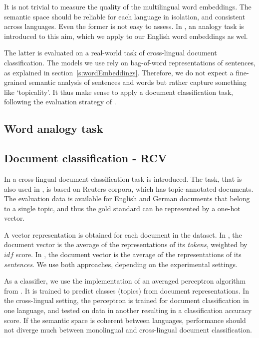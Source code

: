 

It is not trivial to measure the quality of the multilingual word embeddings. The semantic space should be reliable for each language in isolation, and consistent across languages. 
Even the former is not easy to assess. In \cite{mikolov2013efficient}, an analogy task is introduced to this aim, which we apply to our English word embeddings as wel.

The latter is evaluated on a real-world task of cross-lingual document classification. The models we use rely on bag-of-word representations of sentences, as explained in section~\ref{s:wordEmbeddings}. Therefore, we do not expect a fine-grained semantic analysis of sentences and words but rather capture something like `topicality'. It thus make sense to apply a document classification task, following the evaluation strategy of  \cite{klementiev2012inducing, hermann2013multilingual,hermann2014multilingual}.


\subsection{Word analogy task}


\subsection{Document classification - RCV}
In \cite{klementiev2012inducing} a cross-lingual document classification task is introduced. The task, that is also used in \cite{hermann2013multilingual}, is based on Reuters corpora, which has topic-annotated documents. The evaluation data is available for English and German documents that belong to a single topic, and thus the gold standard can be represented by a one-hot vector.

A vector representation is obtained for each document in the dataset. In \cite{klementiev2012inducing}, the document vector is the average of the representations of its \emph{tokens}, weighted by $idf$ score. In \cite{hermann2013multilingual}, the document vector is the average of the representations of its \emph{sentences}. We use both approaches, depending on the experimental settings.

As a classifier, we use the implementation of an averaged perceptron algorithm from \cite{klementiev2012inducing}. It is trained to predict classes (topics) from document representations. In the cross-lingual setting, the perceptron is trained for document classification in one language, and tested on data in another resulting in a classification accuracy score. If the semantic space is coherent between languages, performance should not diverge much between monolingual and cross-lingual document classification. 


